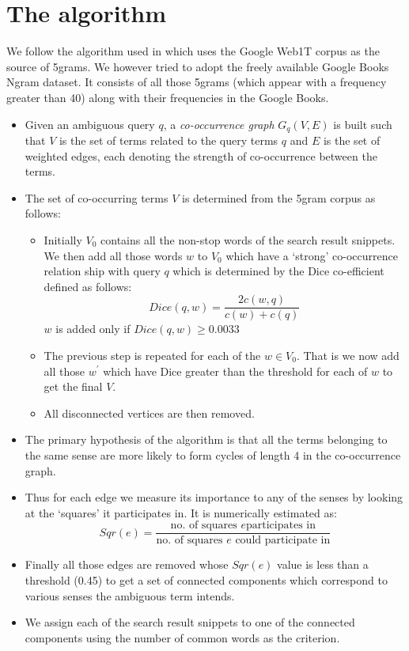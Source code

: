 \documentclass[a4paper,12pt]{report}
\begin{document}
\section{The algorithm}
We follow the algorithm used in \cite{navigli} which uses the Google
Web1T corpus as the source of 5grams. We however tried to adopt the
freely available Google Books Ngram dataset. It consists of all those
5grams (which appear with a frequency greater than 40) along with
their frequencies in the Google Books.
\begin{itemize}
  \item Given an ambiguous query $q$, a {\it co-occurrence graph}
    $G_q(V,E)$ is built such that $V$ is the set of terms related to
    the query terms $q$ and $E$ is the set of weighted edges, each
    denoting the strength of co-occurrence between the terms.
  \item The set of co-occurring terms $V$ is determined from the
    5gram corpus as follows:
    \begin{itemize}
      \item Initially $V_0$ contains all the non-stop words of the
        search result snippets. We then add all those words $w$ to
        $V_0$ which have a `strong' co-occurrence relation ship with
        query $q$ which is determined by the Dice co-efficient defined
        as follows:
        \begin{equation*}
          Dice(q,w) = \frac{2c(w,q)}{c(w) + c(q)}
        \end{equation*}
        $w$ is added only if $Dice(q,w) \ge 0.0033$
      \item The previous step is repeated for each of the $w \in
        V_0$. That is we now add all those $w^\prime$ which have Dice
        greater than the threshold for each of $w$ to get the final
        $V$.
      \item All disconnected vertices are then removed.
    \end{itemize}
     \item The primary hypothesis of the algorithm is that all the
        terms belonging to the same sense are more likely to form
        cycles of length 4 in the co-occurrence graph.
     \item Thus for each edge we measure its importance to any of the
        senses by looking at the `squares' it participates in. It is
        numerically estimated as:
      \begin{equation*}
          Sqr(e) = \frac{\mbox{no. of squares $e$
              participates in}}{\mbox{no. of squares $e$ could
              participate in}}
       \end{equation*}
     \item Finally all those edges are removed whose $Sqr(e)$ value
        is less than a threshold (0.45) to get a set of connected
        components which correspond to various senses the ambiguous
        term intends.
     \item We assign each of the search result snippets to one of the
       connected components using the number of common words as the
       criterion. 
\end{itemize}
\end{document}
